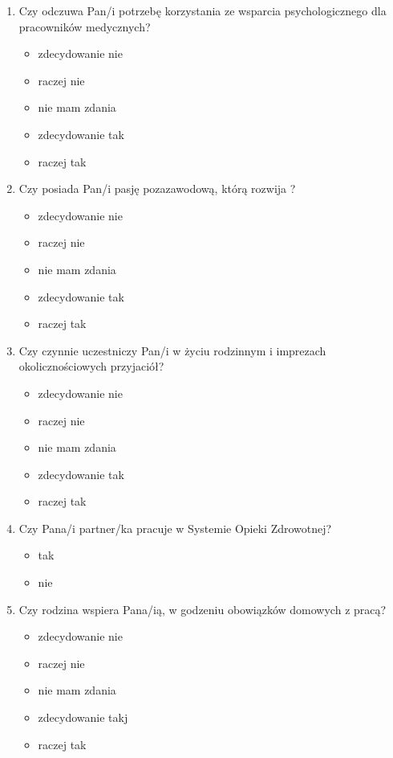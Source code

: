 \documentclass[a4paper,12pt,twoside,openright]{mwrep}
\begin{document}
\begin{enumerate}[label=\arabic*)]
			\item{ Czy odczuwa Pan/i potrzebę korzystania ze wsparcia psychologicznego dla pracowników medycznych?}
		\begin{itemize}
			\item{zdecydowanie nie}
			\item{raczej nie}
			\item{nie mam zdania}
			\item{zdecydowanie tak}
			\item{raczej tak}
		\end{itemize}
		\vspace{\baselineskip}
		
			\item{ Czy posiada Pan/i pasję pozazawodową, którą rozwija ?}
		\begin{itemize}
			\item{zdecydowanie nie}
			\item{raczej nie}
			\item{nie mam zdania}
			\item{zdecydowanie tak}
			\item{raczej tak}
		\end{itemize}
		\vspace{\baselineskip}
		
			\item{Czy czynnie uczestniczy Pan/i w życiu rodzinnym i imprezach okolicznościowych przyjaciół?}
		\begin{itemize}
			\item{zdecydowanie nie}
			\item{raczej nie}
			\item{nie mam zdania}
			\item{zdecydowanie tak}
			\item{raczej tak}
		\end{itemize}
		\vspace{\baselineskip}
		
			\item{Czy Pana/i partner/ka pracuje w Systemie Opieki Zdrowotnej?}
		\begin{itemize}
		\item{tak}
		\item{nie}
		\end{itemize}
		\vspace{\baselineskip}
		
			\item{Czy rodzina wspiera Pana/ią, w godzeniu obowiązków domowych z pracą?}
		\begin{itemize}
			\item{zdecydowanie nie}
			\item{raczej nie}
			\item{nie mam zdania}
			\item{zdecydowanie takj}
			\item{raczej tak}
			\end{itemize}
		\vspace{\baselineskip}
		

\end{enumerate}
\end{document}
